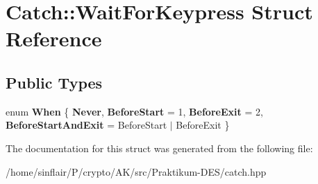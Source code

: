 \hypertarget{structCatch_1_1WaitForKeypress}{}\section{Catch\+:\+:Wait\+For\+Keypress Struct Reference}
\label{structCatch_1_1WaitForKeypress}
\subsection*{Public Types}
\begin{DoxyCompactItemize}
\item 
\mbox{\label{structCatch_1_1WaitForKeypress_a2e8c4369d0a605d64e3e83b5af3399ba}} 
enum {\bfseries When} \{ {\bfseries Never}, 
{\bfseries Before\+Start} = 1, 
{\bfseries Before\+Exit} = 2, 
{\bfseries Before\+Start\+And\+Exit} = Before\+Start $\vert$ Before\+Exit
 \}
\end{DoxyCompactItemize}


The documentation for this struct was generated from the following file\+:\begin{DoxyCompactItemize}
\item 
/home/sinflair/\+P/crypto/\+A\+K/src/\+Praktikum-\/\+D\+E\+S/catch.\+hpp\end{DoxyCompactItemize}

